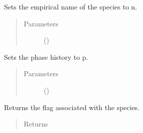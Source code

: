 \documentclass[letterpaper,10pt,openany,oneside,english]{sphinxmanual}
\begin{document}
\begin{fulllineitems}
\begin{fulllineitems}
\end{fulllineitems}


\begin{fulllineitems}
\label{\detokenize{support_rst/specie:specie.Specie.SetName}}
Sets the empirical  name of the species to n.
\begin{quote}\begin{description}
\item[{Parameters}] \leavevmode
{} () \textendash{} 

\end{description}\end{quote}

\end{fulllineitems}


\begin{fulllineitems}
\label{\detokenize{support_rst/specie:specie.Specie.SetPhase}}
Sets the phase history to p.
\begin{quote}\begin{description}
\item[{Parameters}] \leavevmode
{} () \textendash{} 

\end{description}\end{quote}

\end{fulllineitems}


\begin{fulllineitems}
\label{\detokenize{support_rst/specie:specie.Specie.atoms}}
\end{fulllineitems}


\begin{fulllineitems}
\label{\detokenize{support_rst/specie:specie.Specie.flag}}
Returns the flag associated with the species.
\begin{quote}\begin{description}
\item[{Returns}] \leavevmode
{}


\end{description}
\end{quote}
\end{fulllineitems}
\end{fulllineitems}
\end{document}

